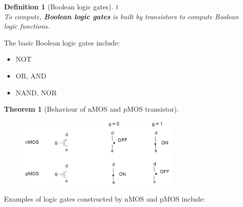 \documentclass[12pt]{article}
\newtheorem{definition}{Definition}[section]
\newtheorem{theorem}{Theorem}[section]
\theoremstyle{definition}
\begin{document}
\begin{definition}[Boolean logic gates]t
\hfill\\\normalfont To compute, \textbf{Boolean logic gates} is built by transistors to compute Boolean logic functions.
\end{definition}
The basic Boolean logic gates include:
\begin{itemize}
  \item NOT
  \item OR, AND
  \item NAND, NOR
\end{itemize}
\clearpage
\begin{theorem}[Behaviour of nMOS and pMOS transistor]
\hfill\\\normalfont
\begin{figure}[h]
\centering
\includegraphics[width = 0.7\textwidth]{1_2.png}
\end{figure}
\end{theorem}
Examples of logic gates constructed by nMOS and pMOS include:
\end{document}
